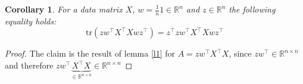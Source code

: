 \documentclass[10pt,a4paper]{article}
\newtheorem{corollary}[lemma]{Corollary}
\newcommand {\R} {\mathbb{R}}
\newcommand{\tr}{\text{tr}}
\newcommand{\1}{\mymathbb{1}}
\begin{document}
\begin{corollary}
    For a data matrix $X$, $w=\frac{1}{n}1\in \R^n$ and $z\in\R^n$ the following equality holds:
    \[\tr(zw^\intercal X^\intercal Xwz^\intercal)=z^\intercal zw^\intercal X^\intercal Xwz^\intercal\]
\end{corollary}

\begin{proof}
    The claim is the result of lemma \ref{l1} for $A=zw^\intercal X^\intercal X$, since 
    $zw^\intercal\in \R^{n\times n}$ and therefore $zw^\intercal \underbrace{ X^\intercal X}_{\in \R^{n\times n}} \in \R^{n\times n}$
\end{proof}
\end{document}
